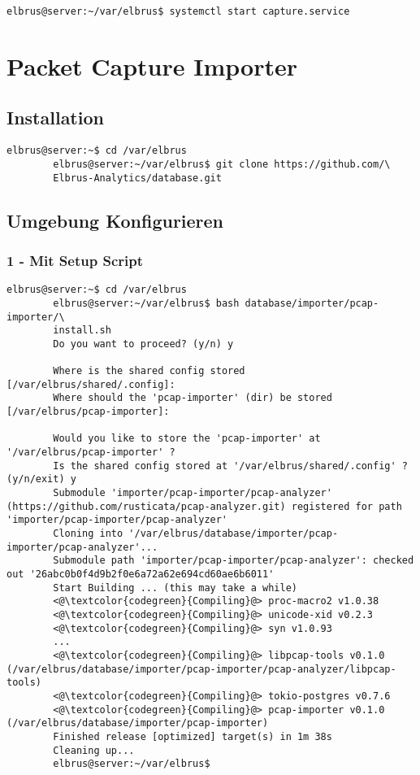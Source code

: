 \documentclass{article}
\begin{document}
	\begin{lstlisting}[caption={Starten des Serviceprogrammes.}]
		elbrus@server:~/var/elbrus$ systemctl start capture.service
	\end{lstlisting}
	
	\newpage
	
	
	\section{Packet Capture Importer}
	\subsection{Installation}
	\begin{lstlisting}[caption={Clonen der Software von GitHub.}]
		elbrus@server:~$ cd /var/elbrus
		elbrus@server:~/var/elbrus$ git clone https://github.com/\
		Elbrus-Analytics/database.git
	\end{lstlisting}

	\subsection[file config]{Umgebung Konfigurieren}
	\subsubsection{1 - Mit Setup Script}
	\begin{lstlisting}[caption={Ausführen des 'install.sh' Scripts.}, breaklines=true,]
		elbrus@server:~$ cd /var/elbrus
		elbrus@server:~/var/elbrus$ bash database/importer/pcap-importer/\
		install.sh
		Do you want to proceed? (y/n) y
		
		Where is the shared config stored [/var/elbrus/shared/.config]: 
		Where should the 'pcap-importer' (dir) be stored [/var/elbrus/pcap-importer]: 
		
		Would you like to store the 'pcap-importer' at '/var/elbrus/pcap-importer' ?
		Is the shared config stored at '/var/elbrus/shared/.config' ? (y/n/exit) y
		Submodule 'importer/pcap-importer/pcap-analyzer' (https://github.com/rusticata/pcap-analyzer.git) registered for path 'importer/pcap-importer/pcap-analyzer'
		Cloning into '/var/elbrus/database/importer/pcap-importer/pcap-analyzer'...
		Submodule path 'importer/pcap-importer/pcap-analyzer': checked out '26abc0b0f4d9b2f0e6a72a62e694cd60ae6b6011'
		Start Building ... (this may take a while)
		<@\textcolor{codegreen}{Compiling}@> proc-macro2 v1.0.38
		<@\textcolor{codegreen}{Compiling}@> unicode-xid v0.2.3
		<@\textcolor{codegreen}{Compiling}@> syn v1.0.93
		...
		<@\textcolor{codegreen}{Compiling}@> libpcap-tools v0.1.0 (/var/elbrus/database/importer/pcap-importer/pcap-analyzer/libpcap-tools)
		<@\textcolor{codegreen}{Compiling}@> tokio-postgres v0.7.6
		<@\textcolor{codegreen}{Compiling}@> pcap-importer v0.1.0 (/var/elbrus/database/importer/pcap-importer)
		Finished release [optimized] target(s) in 1m 38s
		Cleaning up...
		elbrus@server:~/var/elbrus$
	\end{lstlisting}
	
\end{document}
